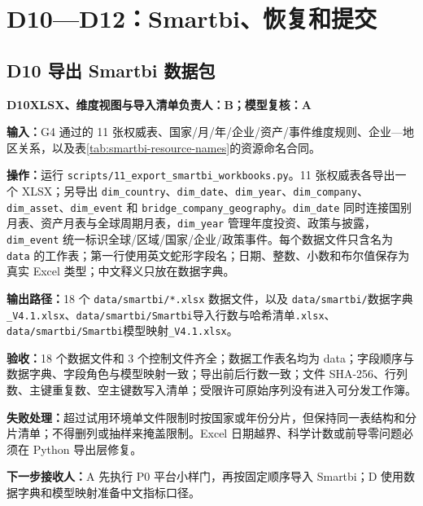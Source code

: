 \documentclass[UTF8,fontset=windows,12pt,openany]{ctexbook}
\newcommand{\Field}[1]{{\small\nolinkurl{#1}}}
\newcommand{\File}[1]{{\small\begingroup\urlstyle{same}\nolinkurl{#1}\endgroup}}
\newcommand{\StepTitle}[3]{%
  \noindent\colorbox{DeepNavy}{\parbox{0.965\textwidth}{\color{white}\Large\bfseries #1\quad #2\hfill\normalsize #3}}\par\medskip
}
\newcommand{\CardRow}[2]{\noindent\textbf{#1：}#2\par}
\begin{document}
\chapter{D10—D12：Smartbi、恢复和提交}

\section{D10 导出 Smartbi 数据包}
\StepTitle{D10}{XLSX、维度视图与导入清单}{负责人：B；模型复核：A}
\CardRow{输入}{G4 通过的 11 张权威表、国家/月/年/企业/资产/事件维度规则、企业—地区关系，以及表\ref{tab:smartbi-resource-names}的资源命名合同。}
\CardRow{操作}{运行 \File{scripts/11_export_smartbi_workbooks.py}。11 张权威表各导出一个 XLSX；另导出 \Field{dim_country}、\Field{dim_date}、\Field{dim_year}、\Field{dim_company}、\Field{dim_asset}、\Field{dim_event} 和 \Field{bridge_company_geography}。\Field{dim_date} 同时连接国别月表、资产月表与全球周期月表，\Field{dim_year} 管理年度投资、政策与披露，\Field{dim_event} 统一标识全球/区域/国家/企业/政策事件。每个数据文件只含名为 \Field{data} 的工作表；第一行使用英文蛇形字段名；日期、整数、小数和布尔值保存为真实 Excel 类型；中文释义只放在数据字典。}
\CardRow{输出路径}{18 个 \File{data/smartbi/*.xlsx} 数据文件，以及 \File{data/smartbi/}\textsf{数据字典}\File{_V4.1.xlsx}、\File{data/smartbi/Smartbi}\textsf{导入行数与哈希清单}\File{.xlsx}、\File{data/smartbi/Smartbi}\textsf{模型映射}\File{_V4.1.xlsx}。}
\CardRow{验收}{18 个数据文件和 3 个控制文件齐全；数据工作表名均为 data；字段顺序与数据字典、字段角色与模型映射一致；导出前后行数一致；文件 SHA-256、行列数、主键重复数、空主键数写入清单；受限许可原始序列没有进入可分发工作簿。}
\CardRow{失败处理}{超过试用环境单文件限制时按国家或年份分片，但保持同一表结构和分片清单；不得删列或抽样来掩盖限制。Excel 日期越界、科学计数或前导零问题必须在 Python 导出层修复。}
\CardRow{下一步接收人}{A 先执行 P0 平台小样门，再按固定顺序导入 Smartbi；D 使用数据字典和模型映射准备中文指标口径。}
\end{document}
